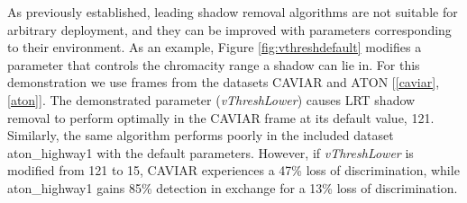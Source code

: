 \documentclass[12pt]{report}
\begin{document}
As previously established, leading shadow removal algorithms are not suitable for arbitrary deployment, and they can be improved with parameters corresponding to their environment. As an example, Figure \ref{fig:vthreshdefault} modifies a parameter that controls the chromacity range a shadow can lie in. For this demonstration we use frames from the datasets CAVIAR and ATON [\ref{caviar}, \ref{aton}]. The demonstrated parameter (\textit{vThreshLower}) causes LRT shadow removal to perform optimally in the CAVIAR frame at its default value, 121. Similarly, the same algorithm performs poorly in the included dataset aton\_highway1 with the default parameters. However, if \textit{vThreshLower} is modified from 121 to 15, CAVIAR experiences a 47\% loss of discrimination, while aton\_highway1 gains 85\% detection in exchange for a 13\% loss of discrimination.
\end{document}

